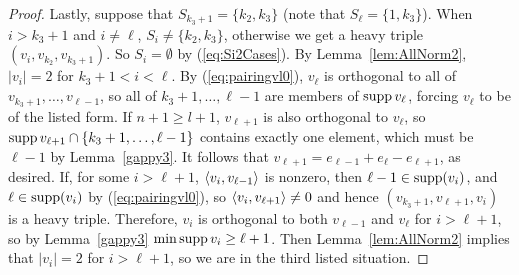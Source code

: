 \begin{proof}
Lastly, suppose that $S_{k_3 + 1} = \{k_2,k_3\}$ (note that $S_\ell = \{ 1, k_3\}$). When $i>k_3+1$ and $i\ne\ell$, $S_i\ne\{k_2,k_3\}$, otherwise we get a heavy triple $(v_i,v_{k_2},v_{k_3+1})$. So $S_i=\emptyset$  by (\ref{eq:Si2Cases}).
By Lemma~\ref{lem:AllNorm2}, $|v_i| = 2$ for $k_3 + 1 < i < \ell$. By (\ref{eq:pairingvl0}), $v_\ell$ is orthogonal to all of $v_{k_3 + 1}, \dots, v_{\ell - 1}$, so all of $k_3 + 1,\dots,\ell-1$ are members of $\operatorname{supp} v_\ell$, forcing $v_\ell$ to be of the listed form. If $n+1\ge l+1$, $v_{\ell+1}$ is also orthogonal to $v_\ell$, so $\operatorname{supp} v_{\ell+1}\cap\{k_3 + 1,\dots,\ell-1\}$ contains exactly one element, which must be $\ell-1$ by Lemma~\ref{gappy3}. It follows that $v_{\ell+1} = e_{\ell-1} + e_\ell - e_{\ell+1}$, as desired. If, for some $i > \ell+1$, $\left\langle v_i , v_{\ell-1} \right\rangle$ is nonzero, then $\ell-1\in\operatorname{supp}(v_i)$, and $\ell\in\operatorname{supp}(v_i)$ by (\ref{eq:pairingvl0}), so $\left\langle v_i , v_{\ell+1} \right\rangle\ne0$ and hence  $(v_{k_3+1}, v_{\ell+1}, v_i)$ is a heavy triple. Therefore, $v_i$ is orthogonal to both $v_{\ell-1}$ and $v_\ell$ for $i > \ell+1$, so by Lemma~\ref{gappy3} $\min \operatorname{supp} v_{i} \ge \ell+1$. Then  Lemma~\ref{lem:AllNorm2} implies that $|v_i| = 2$ for $i > \ell+1$, so we are in the third listed situation.
\end{proof}

